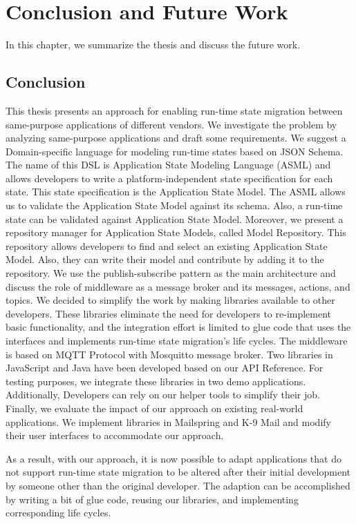 \chapter{Conclusion and Future Work}
\label{ch:conclusion}
In this chapter, we summarize the thesis and discuss the future work.

\section{Conclusion}
This thesis presents an approach for enabling run-time state migration between same-purpose applications of different vendors. We investigate the problem by analyzing same-purpose applications and draft some requirements. We suggest a Domain-specific language for modeling run-time states based on JSON Schema. The name of this DSL is Application State Modeling Language (ASML) and allows developers to write a platform-independent state specification for each state. This state specification is the Application State Model. The ASML allows us to validate the Application State Model against its schema. Also, a run-time state can be validated against Application State Model.
Moreover, we present a repository manager for Application State Models, called Model Repository. This repository allows developers to find and select an existing Application State Model. Also, they can write their model and contribute by adding it to the repository. We use the publish-subscribe pattern as the main architecture and discuss the role of middleware as a message broker and its messages, actions, and topics. We decided to simplify the work by making libraries available to other developers. These libraries eliminate the need for developers to re-implement basic functionality, and the integration effort is limited to glue code that uses the interfaces and implements run-time state migration's life cycles. The middleware is based on MQTT Protocol with Mosquitto message broker. Two libraries in JavaScript and Java have been developed based on our API Reference. For testing purposes, we integrate these libraries in two demo applications.
Additionally, Developers can rely on our helper tools to simplify their job. Finally, we evaluate the impact of our approach on existing real-world applications. We implement libraries in Mailspring and K-9 Mail and modify their user interfaces to accommodate our approach.

As a result, with our approach, it is now possible to adapt applications that do not support run-time state migration to be altered after their initial development by someone other than the original developer. The adaption can be accomplished by writing a bit of glue code, reusing our libraries, and implementing corresponding life cycles.


